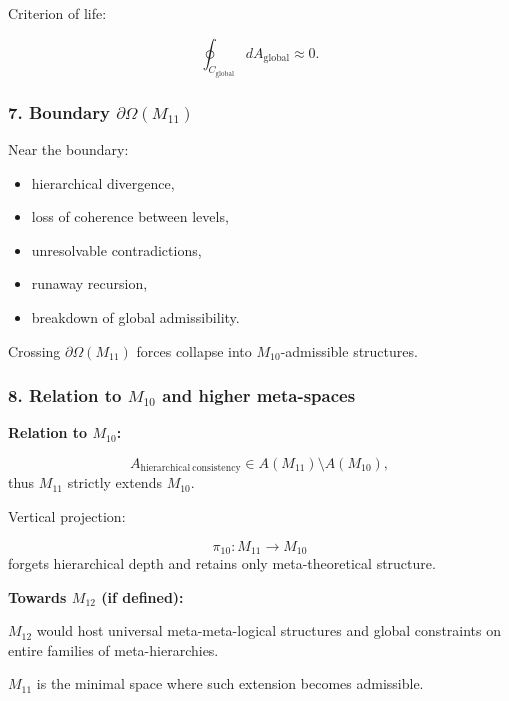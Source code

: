 Criterion of life:

\[
\oint_{C_{\mathrm{global}}} dA_{\mathrm{global}} \approx 0.
\]

\subsubsection*{7. Boundary $\partial\Omega(M_{11})$}

Near the boundary:

\begin{itemize}
    \item hierarchical divergence,
    \item loss of coherence between levels,
    \item unresolvable contradictions,
    \item runaway recursion,
    \item breakdown of global admissibility.
\end{itemize}

Crossing $\partial\Omega(M_{11})$ forces collapse into $M_{10}$-admissible structures.

\subsubsection*{8. Relation to $M_{10}$ and higher meta-spaces}

\textbf{Relation to $M_{10}$:}

\[
A_{\mathrm{hierarchical\ consistency}} \in A(M_{11}) \setminus A(M_{10}),
\]
thus $M_{11}$ strictly extends $M_{10}$.

Vertical projection:

\[
\pi_{10}: M_{11} \to M_{10}
\]
forgets hierarchical depth and retains only meta-theoretical structure.

\textbf{Towards $M_{12}$ (if defined):}

$M_{12}$ would host universal meta-meta-logical structures and  
global constraints on entire families of meta-hierarchies.

$M_{11}$ is the minimal space where such extension becomes admissible.
